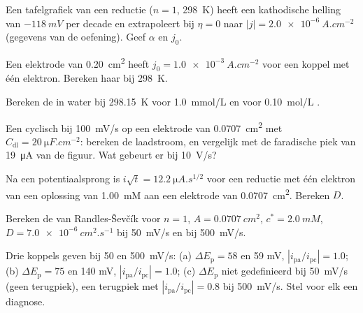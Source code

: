 \begin{exercise}[$\star$]\label{exo:b3:electrode-kinetics:1}
Een tafelgrafiek van een reductie ($n = 1$, \qty{298}{K}) heeft een
kathodische helling van $-\qty{118}{mV}$ per decade en extrapoleert bij
$\eta = 0$ naar $|j| = \qty{2.0e-6}{A.cm^{-2}}$ (gegevens van de oefening).
Geef $\alpha$ en $j_0$.
\end{exercise}

\begin{exercise}[$\star$]\label{exo:b3:electrode-kinetics:2}
Een elektrode van \qty{0.20}{cm^2} heeft $j_0 = \qty{1.0e-3}{A.cm^{-2}}$
voor een koppel met één elektron. Bereken haar 
bij \qty{298}{K}.
\end{exercise}

\begin{exercise}[$\star$]\label{exo:b3:electrode-kinetics:3}
Bereken de  in water bij \qty{298.15}{K} voor \qty{1.0}{mmol/L}
en voor \qty{0.10}{mol/L}
.
\end{exercise}

\begin{exercise}[$\star$]\label{exo:b3:electrode-kinetics:4}
Een cyclisch  bij \qty{100}{mV/s} op een elektrode van
\qty{0.0707}{cm^2} met $C_{\mathrm{dl}} =
\qty{20}{\micro F.cm^{-2}}$: bereken de laadstroom, en vergelijk met de
faradische piek van \qty{19}{\micro A} van de figuur. Wat gebeurt er bij
\qty{10}{V/s}?
\end{exercise}

\begin{exercise}[$\star\star$]\label{exo:b3:electrode-kinetics:5}
Na een potentiaalsprong is $i\sqrt t = \qty{12.2}{\micro A.s^{1/2}}$ voor een
reductie met één elektron van een oplossing van
\qty{1.00}{mM} aan een elektrode van \qty{0.0707}{cm^2}. Bereken $D$.
\end{exercise}

\begin{exercise}[$\star\star$]\label{exo:b3:electrode-kinetics:6}
Bereken de  van Randles-Ševčík voor $n = 1$, $A = \qty{0.0707}{cm^2}$, $c^* = \qty{2.0}{mM}$,
$D = \qty{7.0e-6}{cm^2.s^{-1}}$ bij \qty{50}{mV/s} en bij \qty{500}{mV/s}.
\end{exercise}

\begin{exercise}[$\star\star$]\label{exo:b3:electrode-kinetics:7}
Drie koppels geven bij 50 en \qty{500}{mV/s}: (a) $\Delta E_{\mathrm p} = 58$ en 59 mV, $|i_{\mathrm{pa}}/i_{\mathrm{pc}}| = 1.0$;
(b) $\Delta E_{\mathrm p} = 75$ en 140 mV, $|i_{\mathrm{pa}}/i_{\mathrm{pc}}| = 1.0$; (c) $\Delta E_{\mathrm p}$ niet gedefinieerd bij \qty{50}{mV/s} (geen
terugpiek), een terugpiek met $|i_{\mathrm{pa}}/i_{\mathrm{pc}}| = 0.8$ bij \qty{500}{mV/s}. Stel voor elk een
diagnose.
\end{exercise}

